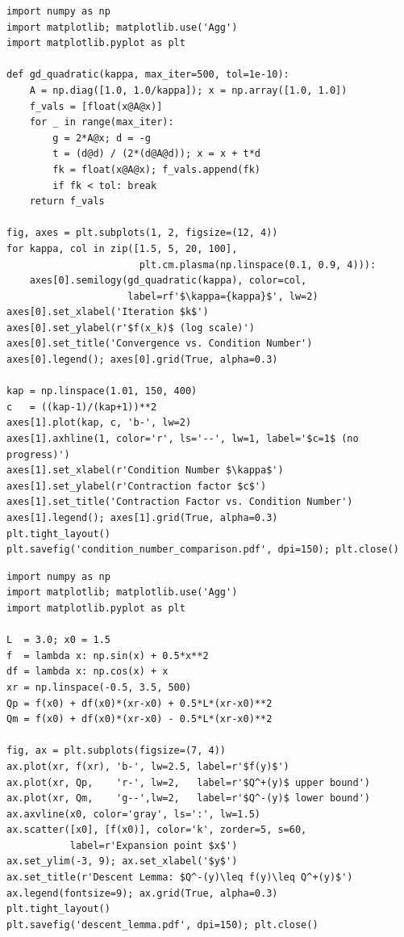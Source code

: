 \documentclass[11pt]{article}
\theoremstyle{definition}
\theoremstyle{plain}
\begin{document}
\begin{Verbatim}[fontsize=\small, label=Listing 2: Condition number effect on convergence,
                  frame=single, labelposition=topline]
import numpy as np
import matplotlib; matplotlib.use('Agg')
import matplotlib.pyplot as plt

def gd_quadratic(kappa, max_iter=500, tol=1e-10):
    A = np.diag([1.0, 1.0/kappa]); x = np.array([1.0, 1.0])
    f_vals = [float(x@A@x)]
    for _ in range(max_iter):
        g = 2*A@x; d = -g
        t = (d@d) / (2*(d@A@d)); x = x + t*d
        fk = float(x@A@x); f_vals.append(fk)
        if fk < tol: break
    return f_vals

fig, axes = plt.subplots(1, 2, figsize=(12, 4))
for kappa, col in zip([1.5, 5, 20, 100],
                       plt.cm.plasma(np.linspace(0.1, 0.9, 4))):
    axes[0].semilogy(gd_quadratic(kappa), color=col,
                     label=rf'$\kappa={kappa}$', lw=2)
axes[0].set_xlabel('Iteration $k$')
axes[0].set_ylabel(r'$f(x_k)$ (log scale)')
axes[0].set_title('Convergence vs. Condition Number')
axes[0].legend(); axes[0].grid(True, alpha=0.3)

kap = np.linspace(1.01, 150, 400)
c   = ((kap-1)/(kap+1))**2
axes[1].plot(kap, c, 'b-', lw=2)
axes[1].axhline(1, color='r', ls='--', lw=1, label='$c=1$ (no progress)')
axes[1].set_xlabel(r'Condition Number $\kappa$')
axes[1].set_ylabel(r'Contraction factor $c$')
axes[1].set_title('Contraction Factor vs. Condition Number')
axes[1].legend(); axes[1].grid(True, alpha=0.3)
plt.tight_layout()
plt.savefig('condition_number_comparison.pdf', dpi=150); plt.close()
\end{Verbatim}

\begin{Verbatim}[fontsize=\small, label=Listing 3: Descent Lemma illustration,
                  frame=single, labelposition=topline]
import numpy as np
import matplotlib; matplotlib.use('Agg')
import matplotlib.pyplot as plt

L  = 3.0; x0 = 1.5
f  = lambda x: np.sin(x) + 0.5*x**2
df = lambda x: np.cos(x) + x
xr = np.linspace(-0.5, 3.5, 500)
Qp = f(x0) + df(x0)*(xr-x0) + 0.5*L*(xr-x0)**2
Qm = f(x0) + df(x0)*(xr-x0) - 0.5*L*(xr-x0)**2

fig, ax = plt.subplots(figsize=(7, 4))
ax.plot(xr, f(xr), 'b-', lw=2.5, label=r'$f(y)$')
ax.plot(xr, Qp,    'r-', lw=2,   label=r'$Q^+(y)$ upper bound')
ax.plot(xr, Qm,    'g--',lw=2,   label=r'$Q^-(y)$ lower bound')
ax.axvline(x0, color='gray', ls=':', lw=1.5)
ax.scatter([x0], [f(x0)], color='k', zorder=5, s=60,
           label=r'Expansion point $x$')
ax.set_ylim(-3, 9); ax.set_xlabel('$y$')
ax.set_title(r'Descent Lemma: $Q^-(y)\leq f(y)\leq Q^+(y)$')
ax.legend(fontsize=9); ax.grid(True, alpha=0.3)
plt.tight_layout()
plt.savefig('descent_lemma.pdf', dpi=150); plt.close()
\end{Verbatim}
\end{document}
